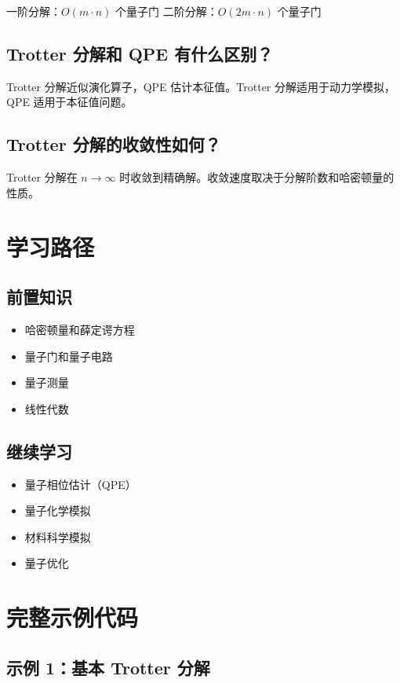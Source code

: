 \documentclass[12pt,a4paper]{article}
\begin{document}
一阶分解：$O(m \cdot n)$ 个量子门
二阶分解：$O(2m \cdot n)$ 个量子门

\subsection{Trotter 分解和 QPE 有什么区别？}

Trotter 分解近似演化算子，QPE 估计本征值。Trotter 分解适用于动力学模拟，QPE 适用于本征值问题。

\subsection{Trotter 分解的收敛性如何？}

Trotter 分解在 $n \to \infty$ 时收敛到精确解。收敛速度取决于分解阶数和哈密顿量的性质。

\section{学习路径}

\subsection{前置知识}
\begin{itemize}
  \item 哈密顿量和薛定谔方程
  \item 量子门和量子电路
  \item 量子测量
  \item 线性代数
\end{itemize}

\subsection{继续学习}
\begin{itemize}
  \item 量子相位估计（QPE）
  \item 量子化学模拟
  \item 材料科学模拟
  \item 量子优化
\end{itemize}

\section{完整示例代码}

\subsection{示例 1：基本 Trotter 分解}
\end{document}
